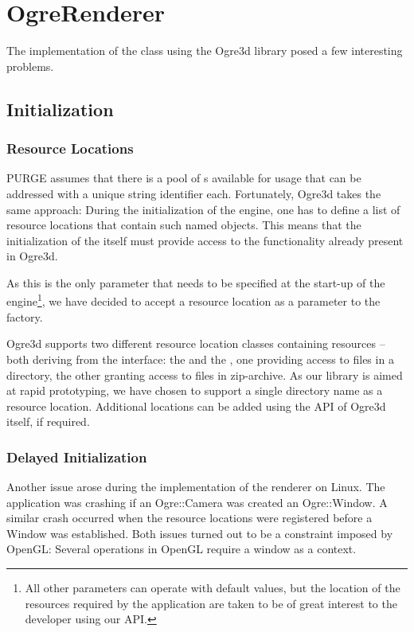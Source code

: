 \section{OgreRenderer}
\label{chapter:implementation:ogrerenderer}

	The implementation of the  class using the Ogre3d library posed a few interesting problems.

	\subsection{Initialization}

		\subsubsection{Resource Locations}

			PURGE assumes that there is a pool of s available for usage that can be addressed with a unique string identifier each. Fortunately, Ogre3d takes the same approach: During the initialization of the engine, one has to define a list of resource locations that contain such named objects. This means that the initialization of the  itself must provide access to the functionality already present in Ogre3d.

			As this is the only parameter that needs to be specified at the start-up of the engine\footnote{All other parameters can operate with default values, but the location of the resources required by the application are taken to be of great interest to the developer using our API.}, we have decided to accept a resource location as a parameter to the factory.

			Ogre3d supports two different resource location classes containing resources -- both deriving from the  interface: the  and the , one providing access to files in a directory, the other granting access to files in zip-archive. As our library is aimed at rapid prototyping, we have chosen to support a single directory name as a resource location. Additional locations can be added using the API of Ogre3d itself, if required.

		\subsubsection{Delayed Initialization}

			Another issue arose during the implementation of the renderer on Linux. The application was crashing if an Ogre::Camera was created an Ogre::Window. A similar crash occurred when the resource locations were registered before a Window was established. Both issues turned out to be a constraint imposed by OpenGL: Several operations in OpenGL require a window as a context.
			
